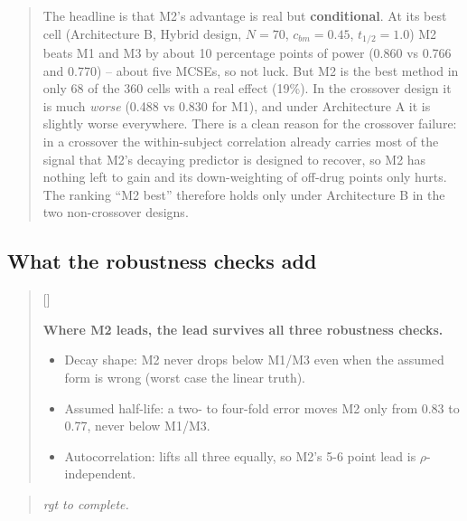 \documentclass[
  11pt,
]{article}
\newcounter{pgraph}
\newenvironment{bullets}{%
  \stepcounter{pgraph}%
  \begin{quote}\small\sffamily\color[gray]{0.30}%
  {\normalfont\scriptsize\color[gray]{0.58}[\thepgraph]\enspace}}{%
  \end{quote}}
\newenvironment{rgt}{%
  \begin{quote}\small\itshape\color[RGB]{20,60,160}}{%
  \end{quote}}
\newenvironment{orig}{%
  \begin{quote}\normalsize\color[gray]{0.55}}{%
  \end{quote}}
\begin{document}
\begin{orig}
The headline is that M2's advantage is real but \textbf{conditional}.
At its best cell (Architecture B, Hybrid design, \(N = 70\),
\(c_{bm} = 0.45\), \(t_{1/2} = 1.0\)) M2 beats M1 and M3 by about 10
percentage points of power (0.860 vs 0.766 and 0.770) -- about five
MCSEs, so not luck. But M2 is the best method
in only 68 of the 360 cells with a real effect (19\%). In the
crossover design it is much \emph{worse} (0.488 vs 0.830 for M1), and
under Architecture A it is slightly worse everywhere. There is a
clean reason for the crossover failure: in a crossover the
within-subject correlation already carries most of the signal that
M2's decaying predictor is designed to recover, so M2 has nothing
left to gain and its down-weighting of off-drug points only hurts.
The ranking ``M2 best'' therefore holds only under Architecture B in
the two non-crossover designs.

\end{orig}

\subsection{What the robustness checks add}\label{what-the-robustness-checks-add}

\begin{bullets}

\textbf{Where M2 leads, the lead survives all three robustness
checks.}

\begin{itemize}\setlength{\itemsep}{2pt}\setlength{\parskip}{0pt}
\item Decay shape: M2 never drops below M1/M3 even when the assumed
form is wrong (worst case the linear truth).
\item Assumed half-life: a two- to four-fold error moves M2 only
from 0.83 to 0.77, never below M1/M3.
\item Autocorrelation: lifts all three equally, so M2's 5-6 point
lead is $\rho$-independent.
\end{itemize}

\end{bullets}

\begin{rgt}
rgt to complete.

\end{rgt}
\end{document}

